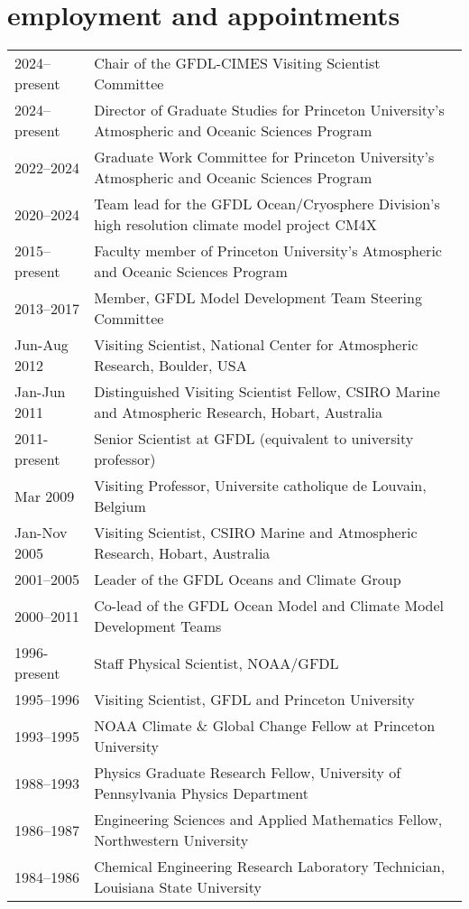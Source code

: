 \documentclass{article}
\begin{document}
\vspace{-.5cm}
\section*{\sc \color{Maroon}   employment and appointments} 
\vspace{-.25cm}
\begin{tabular}{ll}
  2024--present & Chair of the GFDL-CIMES Visiting Scientist  Committee
  \\
   2024--present & Director of Graduate Studies for Princeton University's Atmospheric and Oceanic Sciences Program
  \\
  2022--2024 & Graduate Work Committee for Princeton University's Atmospheric and Oceanic Sciences Program
  \\
  2020--2024 & Team lead for the GFDL Ocean/Cryosphere Division's high resolution climate model project CM4X 
  \\
  2015--present & Faculty member of Princeton University's Atmospheric and Oceanic Sciences Program
  \\
  2013--2017  & Member, GFDL Model Development Team Steering Committee  \\
  Jun-Aug 2012  & Visiting Scientist, National Center for Atmospheric
                  Research, Boulder, USA \\
  Jan-Jun 2011   & Distinguished Visiting Scientist Fellow, CSIRO Marine and Atmospheric Research, Hobart, Australia \\
  2011-present & Senior Scientist at GFDL (equivalent to university professor) \\ 
  Mar 2009         & Visiting Professor, Universite catholique de Louvain, Belgium \\
  Jan-Nov 2005   & Visiting Scientist, CSIRO Marine and Atmospheric  Research, Hobart, Australia \\
  2001--2005     & Leader of the GFDL Oceans and Climate Group \\
  2000--2011     & Co-lead of the GFDL Ocean Model and Climate Model Development Teams \\
  1996-present   &  Staff Physical Scientist, NOAA/GFDL \\  
  1995--1996     &  Visiting Scientist, GFDL and Princeton University  \\ 
  1993--1995     & NOAA Climate \& Global Change Fellow at Princeton University \\
  1988--1993     &  Physics Graduate Research Fellow, University of Pennsylvania Physics Department  \\                     
  1986--1987     &  Engineering Sciences and Applied Mathematics Fellow, Northwestern University \\
  1984--1986     &  Chemical Engineering Research Laboratory Technician, Louisiana State University
\end{tabular}
\end{document}
